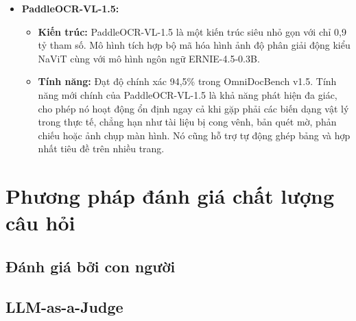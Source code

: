 \begin{itemize}
    \item \textbf{PaddleOCR-VL-1.5:}
    \begin{itemize}
        \item \textbf{Kiến trúc:} PaddleOCR-VL-1.5 là một kiến trúc siêu nhỏ gọn với chỉ 0,9 tỷ tham số. Mô hình tích hợp bộ mã hóa hình ảnh độ phân giải động kiểu NaViT cùng với mô hình ngôn ngữ ERNIE-4.5-0.3B.
        \item \textbf{Tính năng:} Đạt độ chính xác 94,5\% trong OmniDocBench v1.5. Tính năng mới chính của PaddleOCR-VL-1.5 là khả năng phát hiện đa giác, cho phép nó hoạt động ổn định ngay cả khi gặp phải các biến dạng vật lý trong thực tế, chẳng hạn như tài liệu bị cong vênh, bản quét mờ, phản chiếu hoặc ảnh chụp màn hình. Nó cũng hỗ trợ tự động ghép bảng và hợp nhất tiêu đề trên nhiều trang.
    \end{itemize}
\end{itemize}


\section{Phương pháp đánh giá chất lượng câu hỏi}
\subsection{Đánh giá bởi con người}
\subsection{LLM-as-a-Judge}
